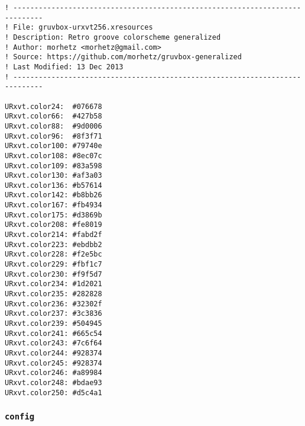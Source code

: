 \documentclass[11pt]{article}
\begin{document}
\lstset{language=conf-xdefaults,label= ,caption= ,captionpos=b,numbers=none}
\begin{lstlisting}
! -----------------------------------------------------------------------------
! File: gruvbox-urxvt256.xresources
! Description: Retro groove colorscheme generalized
! Author: morhetz <morhetz@gmail.com>
! Source: https://github.com/morhetz/gruvbox-generalized
! Last Modified: 13 Dec 2013
! -----------------------------------------------------------------------------

URxvt.color24:  #076678
URxvt.color66:  #427b58
URxvt.color88:  #9d0006
URxvt.color96:  #8f3f71
URxvt.color100: #79740e
URxvt.color108: #8ec07c
URxvt.color109: #83a598
URxvt.color130: #af3a03
URxvt.color136: #b57614
URxvt.color142: #b8bb26
URxvt.color167: #fb4934
URxvt.color175: #d3869b
URxvt.color208: #fe8019
URxvt.color214: #fabd2f
URxvt.color223: #ebdbb2
URxvt.color228: #f2e5bc
URxvt.color229: #fbf1c7
URxvt.color230: #f9f5d7
URxvt.color234: #1d2021
URxvt.color235: #282828
URxvt.color236: #32302f
URxvt.color237: #3c3836
URxvt.color239: #504945
URxvt.color241: #665c54
URxvt.color243: #7c6f64
URxvt.color244: #928374
URxvt.color245: #928374
URxvt.color246: #a89984
URxvt.color248: #bdae93
URxvt.color250: #d5c4a1
\end{lstlisting}

\subsubsection{\texttt{config}}
\label{sec:orge1c6858}
\end{document}
